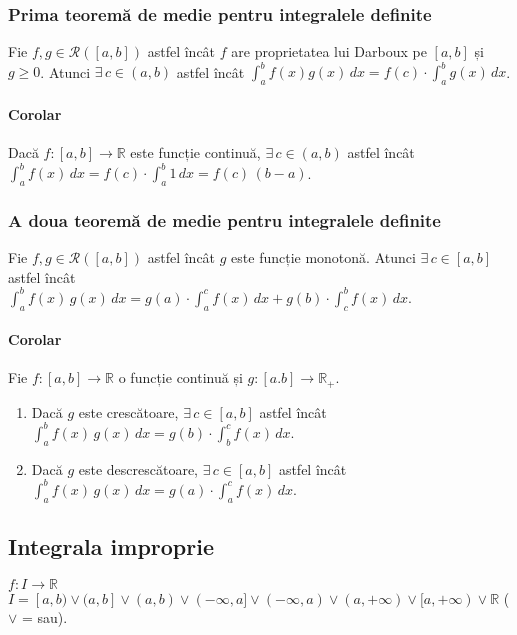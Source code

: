 \subsubsection{Prima teoremă de medie pentru integralele definite}
Fie $f, g \in \mathcal{R}([a,b])$ astfel încât $f$ are proprietatea lui Darboux pe $[a,b]$ și $g \geq 0$. Atunci $\exists \, c \in (a, b)$
astfel încât $\displaystyle\int_{a}^{b} f(x) g(x) \, dx = f(c) \cdot \displaystyle\int_{a}^{b} g(x) \, dx$.

\paragraph{Corolar}
Dacă $f:[a,b] \rightarrow \mathbb{R}$ este funcție continuă, $\exists \, c \in (a,b)$ astfel încât \\
$\displaystyle\int_{a}^{b} f(x) \, dx = f(c) \cdot \displaystyle\int_{a}^{b} 1 \, dx = f(c) \, (b-a)$.

\subsubsection{A doua teoremă de medie pentru integralele definite}
Fie $f, g \in \mathcal{R}([a,b])$ astfel încât $g$ este funcție monotonă. Atunci $\exists \, c \in [a,b]$
astfel încât \\ $\displaystyle\int_{a}^{b} f(x) \, g(x) \, dx = g(a) \cdot \displaystyle\int_{a}^{c} f(x) \, dx + 
g(b) \cdot \displaystyle\int_{c}^{b} f(x) \, dx$.

\paragraph{Corolar}
Fie $f:[a,b] \rightarrow \mathbb{R}$ o funcție continuă și $g:[a.b] \rightarrow \mathbb{R}_{+}$.
\begin{enumerate}[label=\emph{\alph*})]
    \item Dacă $g$ este crescătoare, $\exists \, c \in [a,b]$ astfel încât $\displaystyle\int_{a}^{b} f(x) \, g(x) \, dx =
        g(b) \cdot \displaystyle\int_{b}^{c} f(x) \, dx$.
    \item Dacă $g$ este descrescătoare, $\exists \, c \in [a,b]$ astfel încât $\displaystyle\int_{a}^{b} f(x) \, g(x) \, dx =
        g(a) \cdot \displaystyle\int_{a}^{c} f(x) \, dx$.
\end{enumerate}

\subsection{Integrala improprie}
$f: I \rightarrow \mathbb{R}$ \\
$I = [a,b) \vee (a, b] \vee (a, b) \vee (-\infty, a] \vee (-\infty, a) \vee (a, +\infty) \vee [a, +\infty) \vee \mathbb{R}$ ($\vee$ = sau).

